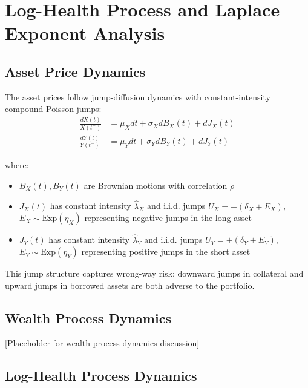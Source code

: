 \documentclass{article}
\theoremstyle{definition}
\begin{document}
\section{Log-Health Process and Laplace Exponent Analysis}

\subsection{Asset Price Dynamics}

The asset prices follow jump-diffusion dynamics with constant-intensity compound Poisson jumps:
\begin{align}
\frac{dX(t)}{X(t^-)} &= \mu_X dt + \sigma_X dB_X(t) + dJ_X(t) \label{eq:X_dynamics}\\
\frac{dY(t)}{Y(t^-)} &= \mu_Y dt + \sigma_Y dB_Y(t) + dJ_Y(t) \label{eq:Y_dynamics}
\end{align}

where:
\begin{itemize}
    \item $B_X(t), B_Y(t)$ are Brownian motions with correlation $\rho$
    \item $J_X(t)$ has constant intensity $\hat\lambda_X$ and i.i.d. jumps $U_X = -(\delta_X + E_X)$, $E_X \sim \mathrm{Exp}(\eta_X)$ representing negative jumps in the long asset
    \item $J_Y(t)$ has constant intensity $\hat\lambda_Y$ and i.i.d. jumps $U_Y = +(\delta_Y + E_Y)$, $E_Y \sim \mathrm{Exp}(\eta_Y)$ representing positive jumps in the short asset
\end{itemize}

This jump structure captures wrong-way risk: downward jumps in collateral and upward jumps in borrowed assets are both adverse to the portfolio.

\subsection{Wealth Process Dynamics}

[Placeholder for wealth process dynamics discussion]

\subsection{Log-Health Process Dynamics}
\end{document}
